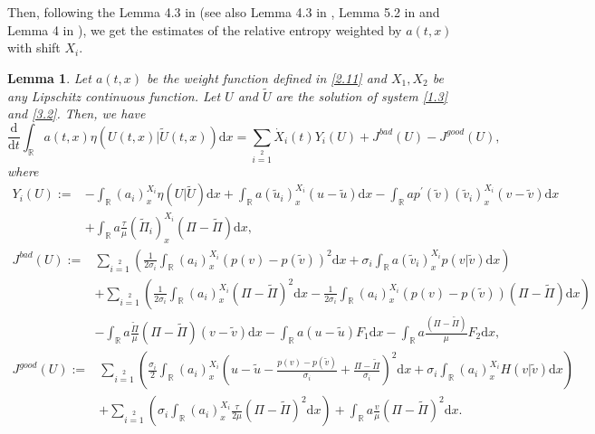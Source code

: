 \documentclass[10pt,reqno]{amsart}
\numberwithin{equation}{section}
\newtheorem{lemma}[theorem]{Lemma}
\newcommand{\dif}{\mathrm{d}}
\begin{document}
Then, following the Lemma 4.3 in \cite{HG} (see also Lemma 4.3 in \cite{WY}, Lemma 5.2 in \cite{KV9} and Lemma 4 in \cite{V27}), we get the estimates of the relative entropy weighted by $a(t,x)$ with shift $X_i$.
\begin{lemma}\label{le4.4}
Let $a(t,x)$ be the weight function defined in \eqref{2.11} and $X_1,X_2$ be any Lipschitz continuous function. Let $U$ and $\widetilde{U}$ are the solution of system \eqref{1.3} and \eqref{3.2}. Then, we have
\begin{equation}\label{4.3}
\frac{\dif}{\dif t}\int_\mathbb{R}a(t,x)\eta(U(t,x)|\widetilde{U}(t,x))\dif x
=\sum\limits_{i=1}\limits^2\dot{X}_i(t)Y_i(U)+J^{bad}(U)-J^{good}(U),
\end{equation}
where
\begin{align*}
Y_i(U):=&-\int_\mathbb{R}(a_i)_x^{X_i}\eta(U|\widetilde{U})\dif x+
\int_\mathbb{R}a(\widetilde{u}_i)^{X_i}_x(u-\widetilde{u})\dif x
    -\int_\mathbb{R}ap^{\prime}(\widetilde{v})(\widetilde{v}_i)^{X_i}_x(v-\widetilde{v})\dif x\\
   & +\int_\mathbb{R}a\frac{\tau}{\mu}(\widetilde{\Pi}_i)^{X_i}_x(\Pi-\widetilde{\Pi})\dif x,
\end{align*}
\begin{align*}
   J^{bad}(U):=&\sum\limits_{i=1}\limits^2
   \left(\frac{1}{2\sigma_i}\int_\mathbb{R}(a_i)_{x}^{X_i}(p(v)-p(\widetilde{v}))^2\dif x
   +\sigma_i\int_\mathbb{R}a(\widetilde{v}_i)^{X_i}_{x}p(v|\widetilde{v})\dif x\right) \\
 &+\sum\limits_{i=1}\limits^2
   \left(\frac{1}{2\sigma_i}\int_\mathbb{R}(a_i)_{x}^{X_i}(\Pi-\widetilde{\Pi})^2\dif x
   -\frac{1}{2\sigma_i}\int_\mathbb{R}(a_i)^{X_i}_{x}(p(v)-p(\widetilde{v}))(\Pi-\widetilde{\Pi})\dif x\right)\\
      &-\int_\mathbb{R}a\frac{\widetilde{\Pi}}{\mu}(\Pi-\widetilde{\Pi})(v-\widetilde{v})\dif x
    -\int_\mathbb{R}a(u-\widetilde{u})F_1\dif x
    -\int_\mathbb{R}a\frac{(\Pi-\widetilde{\Pi})}{\mu}F_2\dif x,
\end{align*}
\begin{align*}
J^{good}(U):=&\sum\limits_{i=1}\limits^2
   \left(\frac{\sigma_i}{2}\int_\mathbb{R}(a_i)_{x}^{X_i}
\left(u-\widetilde{u}-\frac{p(v)-p(\widetilde{v})}{\sigma_i}+\frac{\Pi-\widetilde{\Pi}}{\sigma_i}\right)^2\dif x
   +\sigma_i\int_\mathbb{R}(a_i)^{X_i}_{x}H(v|\widetilde{v})\dif x\right)\\
&+\sum\limits_{i=1}\limits^2
   \left(\sigma_i\int_\mathbb{R}(a_i)^{X_i}_{x}\frac{\tau}{2\mu}(\Pi-\widetilde{\Pi})^2\dif x\right)
     +\int_\mathbb{R}a\frac{v}{\mu}(\Pi-\widetilde{\Pi})^2\dif x.
\end{align*}
\end{lemma}
\end{document}
